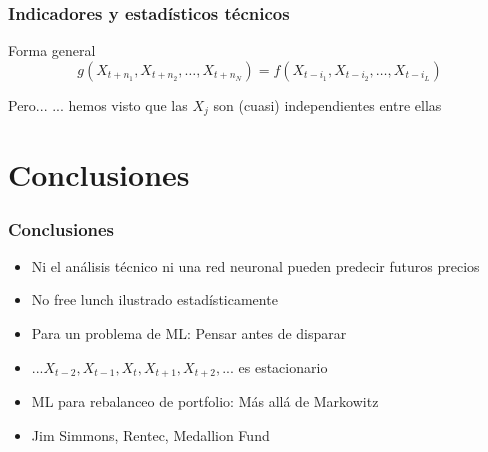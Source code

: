 \documentclass[t,9pt,pdftex]{beamer}
\begin{document}
\begin{frame}[c]
	\frametitle{Indicadores y estad\'isticos t\'ecnicos}
	
	\begin{block}{Forma general}
		$$g(X_{t+n_1}, X_{t+n_2}, \ldots, X_{t+n_N})
	 = f(X_{t-i_1}, X_{t-i_2}, \ldots, X_{t-i_L})$$		
	\end{block}
	
	\begin{exampleblock}{Pero...}
		... hemos visto que las $X_j$ son (cuasi) independientes entre ellas  
	\end{exampleblock}
	
\end{frame}



\section{Conclusiones}

\begin{frame}[c]
	\frametitle{Conclusiones}
	
		\begin{itemize}
		\item Ni el an\'alisis t\'ecnico ni una red neuronal pueden predecir futuros precios
		\item No free lunch ilustrado estad\'isticamente
		\item Para un problema de ML: Pensar antes de disparar
		\item $... X_{t-2}, X_{t-1}, X_{t}, X_{t+1}, X_{t+2}, ...$ es estacionario
		\item ML para rebalanceo de portfolio: M\'as all\'a de Markowitz
		\item Jim Simmons, Rentec, Medallion Fund
		\end{itemize}
	
\end{frame}



\end{document}

